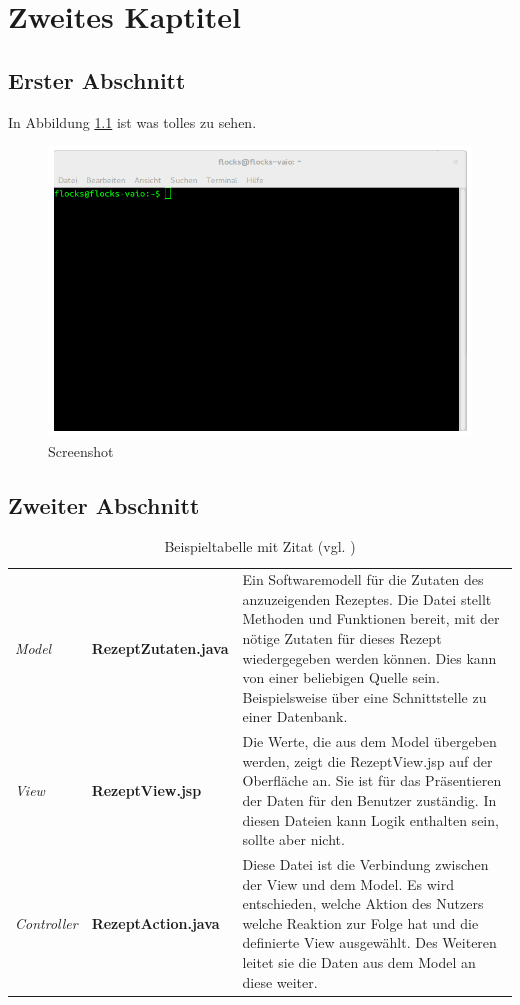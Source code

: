 \chapter{Zweites Kaptitel}
\blindtext
\blinditemize
\section{Erster Abschnitt}
\blindmathpaper

In Abbildung \ref{MeinBild} ist was tolles zu sehen.
\begin{figure}[h]
	\centering
	\includegraphics[width=.7\textwidth] {Bilder/bild.png}
	\caption{Screenshot}\label{MeinBild}
\end{figure}
\FloatBarrier
\blindtext
\section{Zweiter Abschnitt}
\setlength\extrarowheight{5pt}
\begin{table}[h]
	\begin{center}
	\begin{tabular}{ l l p{} }
		\hline
		\emph{Model} & \textbf{RezeptZutaten.java} & Ein Softwaremodell für die Zutaten des anzuzeigenden Rezeptes. Die Datei stellt Methoden und Funktionen bereit, mit der nötige Zutaten für dieses Rezept wiedergegeben werden können. Dies kann von einer beliebigen Quelle sein. Beispielsweise über eine Schnittstelle zu einer Datenbank.\\[.2cm]
		\emph{View} & \textbf{RezeptView.jsp} & Die Werte, die aus dem Model übergeben werden, zeigt die RezeptView.jsp auf der Oberfläche an. Sie ist für das Präsentieren der Daten für den Benutzer zuständig. In diesen Dateien kann Logik enthalten sein, sollte aber nicht.\\[.2cm]
		\emph{Controller} & \textbf{RezeptAction.java} & Diese Datei ist die Verbindung zwischen der View und dem Model. Es wird entschieden, welche Aktion des Nutzers welche Reaktion zur Folge hat und die definierte View ausgewählt. Des Weiteren leitet sie die Daten aus dem Model an diese weiter. \\[.2cm]
		\hline
	\end{tabular}\caption{Beispieltabelle mit Zitat (vgl. \cite[S.~21]{struts})}
\end{center}
\end{table}
\FloatBarrier